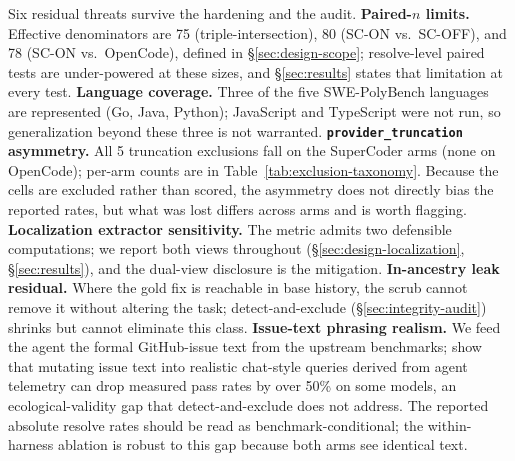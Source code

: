 Six residual threats survive the hardening and the audit. \textbf{Paired-$n$ limits.}
Effective denominators are 75 (triple-intersection), 80 (SC-ON vs.\ SC-OFF), and 78
(SC-ON vs.\ OpenCode), defined in \S\ref{sec:design-scope}; resolve-level paired tests
are under-powered at these sizes, and \S\ref{sec:results} states that limitation at every
test. \textbf{Language coverage.} Three of the five SWE-PolyBench languages are
represented (Go, Java, Python); JavaScript and TypeScript were not run, so
generalization beyond these three is not warranted.
\textbf{\texttt{provider\_truncation} asymmetry.} All 5 truncation exclusions fall on the
SuperCoder arms (none on OpenCode); per-arm counts are in
Table~\ref{tab:exclusion-taxonomy}. Because the cells are excluded rather than scored,
the asymmetry does not directly bias the reported rates, but what was lost differs across
arms and is worth flagging. \textbf{Localization extractor sensitivity.} The metric
admits two defensible computations; we report both views throughout
(\S\ref{sec:design-localization}, \S\ref{sec:results}), and the dual-view disclosure is
the mitigation. \textbf{In-ancestry leak residual.} Where the gold fix is reachable in
base history, the scrub cannot remove it without altering the task; detect-and-exclude
(\S\ref{sec:integrity-audit}) shrinks but cannot eliminate this class.
\textbf{Issue-text phrasing realism.} We feed the agent the formal GitHub-issue text from
the upstream benchmarks; \citet{savingswebench2025} show that mutating issue text into
realistic chat-style queries derived from agent telemetry can drop measured pass rates by
over 50\% on some models, an ecological-validity gap that detect-and-exclude does not
address. The reported absolute resolve rates should be read as benchmark-conditional;
the within-harness ablation is robust to this gap because both arms see identical text.
